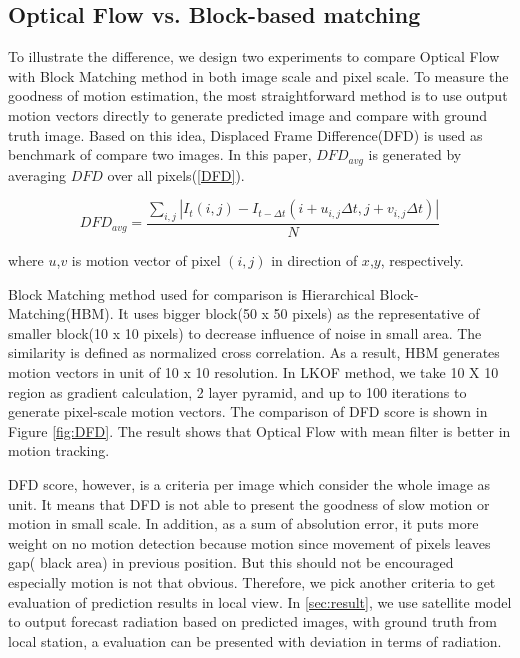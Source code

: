 \documentclass[conference]{IEEEtran}
\begin{document}
\subsection{Optical Flow vs. Block-based matching}
\label{subsec:DFDresult}
To illustrate the difference, we design two experiments to compare Optical Flow
with Block Matching method in both image scale and pixel scale. To measure the
goodness of motion estimation, the most straightforward method is to use
output motion vectors directly to generate predicted image and compare with
ground truth image. Based on this idea, Displaced Frame Difference(DFD) is used
as benchmark of compare two images. In this paper, $DFD_{avg}$ is generated
by averaging $DFD$ over all pixels(\ref{DFD}). 

\begin{equation}
DFD_{avg}=\frac{\sum_{i,j}\left |I_t(i,j)-I_{t-\Delta t}(i+u_{i,j}\Delta
t,j+v_{i,j}\Delta t)\right |}{N}
\label{eq:DFD}
\end{equation}

where $u$,$v$ is motion vector of pixel $(i,j)$ in direction of $x$,$y$,
respectively.

Block Matching method used for comparison is Hierarchical Block-Matching(HBM).
It uses bigger block(50 x 50 pixels) as the representative of smaller block(10
x 10 pixels) to decrease influence of noise in small area. The similarity is
defined as normalized cross correlation. As a result, HBM generates motion
vectors in unit of 10 x 10 resolution. In LKOF method, we take 10 X 10 region
as gradient calculation, 2 layer pyramid, and up to 100 iterations to generate
pixel-scale motion vectors. The comparison of DFD score is shown in Figure
\ref{fig:DFD}. The result shows that Optical Flow with mean filter is better in
motion tracking.

DFD score, however, is a criteria per image which consider the whole image as
unit. It means that DFD is not able to present the goodness of slow motion or
motion in small scale. In addition, as a sum of absolution error, it puts
more weight on no motion detection because motion since movement of pixels
leaves gap( black area) in previous position. But this should not be encouraged
especially motion is not that obvious. Therefore, we pick another criteria to
get evaluation of prediction results in local view. In \ref{sec:result}, we use
satellite model to output forecast radiation based on predicted images, with
ground truth from local station, a evaluation can be presented with
deviation in terms of radiation.
\end{document}
